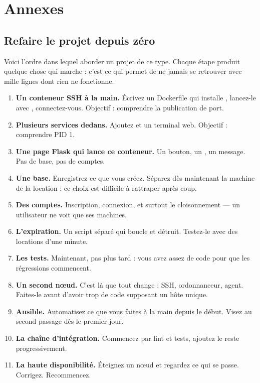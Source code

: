 \part{Annexes}

\chapter{Refaire le projet depuis zéro}

Voici l'ordre dans lequel aborder un projet de ce type. Chaque étape produit
quelque chose qui marche : c'est ce qui permet de ne jamais se retrouver avec
mille lignes dont rien ne fonctionne.

\begin{enumerate}
\item \textbf{Un conteneur SSH à la main.} Écrivez un Dockerfile qui installe
  , lancez-le avec , connectez-vous.
  Objectif : comprendre la publication de port.
\item \textbf{Plusieurs services dedans.} Ajoutez  et un
  terminal web. Objectif : comprendre PID 1.
\item \textbf{Une page Flask qui lance ce conteneur.} Un bouton, un
  , un message. Pas de base, pas de comptes.
\item \textbf{Une base.} Enregistrez ce que vous créez. Séparez dès maintenant
  la machine de la location : ce choix est difficile à rattraper après coup.
\item \textbf{Des comptes.} Inscription, connexion, et surtout le cloisonnement
  --- un utilisateur ne voit que ses machines.
\item \textbf{L'expiration.} Un script séparé qui boucle et détruit. Testez-le
  avec des locations d'une minute.
\item \textbf{Les tests.} Maintenant, pas plus tard : vous avez assez de code
  pour que les régressions commencent.
\item \textbf{Un second nœud.} C'est là que tout change : SSH, ordonnanceur,
  agent. Faites-le avant d'avoir trop de code supposant un hôte unique.
\item \textbf{Ansible.} Automatisez ce que vous faites à la main depuis le
  début. Visez  au second passage dès le premier jour.
\item \textbf{La chaîne d'intégration.} Commencez par lint et tests, ajoutez
  le reste progressivement.
\item \textbf{La haute disponibilité.} Éteignez un nœud et regardez ce qui se
  passe. Corrigez. Recommencez.
\end{enumerate}

